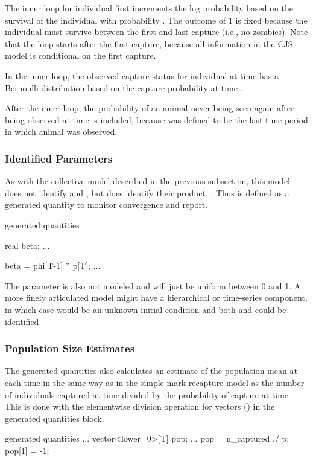 The inner loop for individual  first increments the log
probability based on the survival of the individual with probability
.  The outcome of 1 is fixed because the individual
must survive between the first and last capture (i.e., no zombies).
Note that the loop starts after the first capture, because all
information in the CJS model is conditional on the first capture.

In the inner loop, the observed capture status  for
individual  at time  has a Bernoulli distribution
based on the capture probability  at time .

After the inner loop, the probability of an animal never being seen
again after being observed at time  is included, because
 was defined to be the last time period in which animal
 was observed.

\subsubsection{Identified Parameters}

As with the collective model described in the previous subsection,
this model does not identify  and , but
does identify their product, .  Thus  is defined
as a generated quantity to monitor convergence and report.
%
\begin{stancode}
generated quantities {
  real beta;
  ...

  beta = phi[T-1] * p[T];
  ...
}
\end{stancode}
%

The parameter  is also not modeled and will just be uniform
between 0 and 1.  A more finely articulated model might have a
hierarchical or time-series component, in which case  would
be an unknown initial condition and both  and
 could be identified.

\subsubsection{Population Size Estimates}

The generated quantities also calculates an estimate of the population
mean at each time  in the same way as in the simple
mark-recapture model as the number of individuals captured at time
 divided by the probability of capture at time .  This
is done with the elementwise division operation for vectors
() in the generated quantities block.
%
\begin{stancode}
generated quantities {
  ...
  vector<lower=0>[T] pop;
  ...
  pop = n_captured ./ p;
  pop[1] = -1;
}
\end{stancode}

